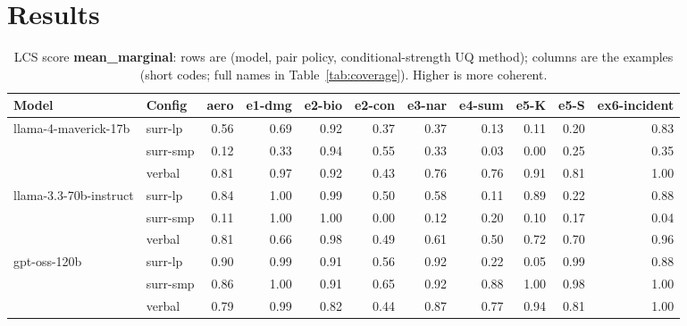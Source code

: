\documentclass[11pt]{article}
\begin{document}
\section{Results}

\begin{table}[htbp]
\centering
\footnotesize
\setlength{\tabcolsep}{3.5pt}
\caption{LCS score \textbf{mean\_marginal}: rows are (model, pair policy, conditional-strength UQ method); columns are the examples (short codes; full names in Table~\ref{tab:coverage}). Higher is more coherent.}
\label{tab:mean-marginal}
\begin{tabular}{llrrrrrrrrr}
\toprule
\textbf{Model} & \textbf{Config} & \textbf{aero} & \textbf{e1-dmg} & \textbf{e2-bio} & \textbf{e2-con} & \textbf{e3-nar} & \textbf{e4-sum} & \textbf{e5-K} & \textbf{e5-S} & \textbf{ex6-incident} \\
\midrule
llama-4-maverick-17b & surr-lp & 0.56 & 0.69 & 0.92 & 0.37 & 0.37 & 0.13 & 0.11 & 0.20 & 0.83 \\
 & surr-smp & 0.12 & 0.33 & 0.94 & 0.55 & 0.33 & 0.03 & 0.00 & 0.25 & 0.35 \\
 & verbal & 0.81 & 0.97 & 0.92 & 0.43 & 0.76 & 0.76 & 0.91 & 0.81 & 1.00 \\
\midrule
llama-3.3-70b-instruct & surr-lp & 0.84 & 1.00 & 0.99 & 0.50 & 0.58 & 0.11 & 0.89 & 0.22 & 0.88 \\
 & surr-smp & 0.11 & 1.00 & 1.00 & 0.00 & 0.12 & 0.20 & 0.10 & 0.17 & 0.04 \\
 & verbal & 0.81 & 0.66 & 0.98 & 0.49 & 0.61 & 0.50 & 0.72 & 0.70 & 0.96 \\
\midrule
gpt-oss-120b & surr-lp & 0.90 & 0.99 & 0.91 & 0.56 & 0.92 & 0.22 & 0.05 & 0.99 & 0.88 \\
 & surr-smp & 0.86 & 1.00 & 0.91 & 0.65 & 0.92 & 0.88 & 1.00 & 0.98 & 1.00 \\
 & verbal & 0.79 & 0.99 & 0.82 & 0.44 & 0.87 & 0.77 & 0.94 & 0.81 & 1.00 \\
\bottomrule
\end{tabular}
\end{table}
\end{document}
